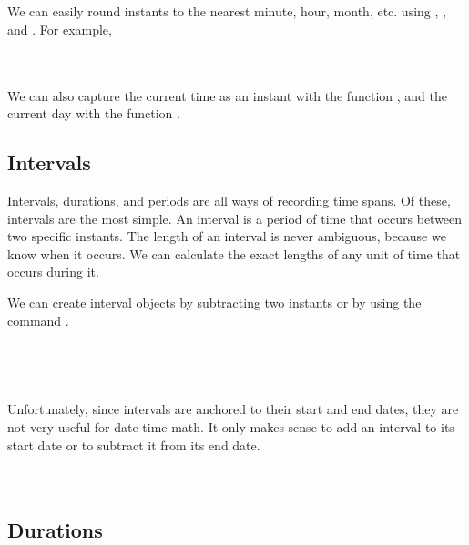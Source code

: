 \documentclass[article]{jss}
\begin{document}
\\
\\

We can easily round instants to the nearest minute, hour, month, etc. using , , and . For example,

\\
\\

We can also capture the current time as an instant with the function , and the current day with the function .



\subsection{Intervals}
\label{sec:intervals}

Intervals, durations, and periods are all ways of recording time spans. Of these, intervals are the most simple. An interval is a period of time that occurs between two specific instants. The length of an interval is never ambiguous, because we know when it occurs. We can calculate the exact lengths of any unit of time that occurs during it. 

We can create interval objects by subtracting two instants or by using the command .\\

\\
\\
\\
\\

Unfortunately, since intervals are anchored to their start and end dates, they are not very useful for date-time math. It only makes sense to add an interval to its start date or to subtract it from its end date.\\

\\
\\


\subsection{Durations}
\label{sec:durations}
\end{document}
